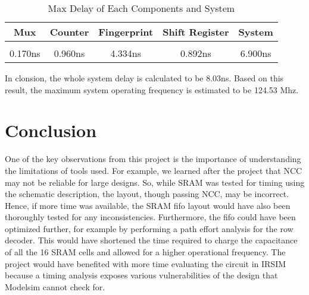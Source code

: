 \documentclass[10pt,journal,compsoc]{IEEEtran}
\begin{document}
    \begin{table}[ht] 
\caption{Max Delay of Each Components and System} %
\centering %
\begin{tabular}{c c c c c} %
\hline\hline %
Mux & Counter & Fingerprint & Shift Register & System\\ [0.5ex] %
\hline %
\\ [0.2 ex]
0.170ns & 0.960ns & 4.334ns & 0.892ns & 6.900ns \\ [1ex] %
\hline %
\end{tabular} 
\label{table:nonlin} %
\end{table} 

    In clonsion, the whole system delay is calculated to be 8.03ns. Based on this result, the maximum system operating frequency is estimated to be 124.53 Mhz. 

\section{Conclusion}
One of the key observations from this project is the importance of understanding the limitations of tools used. For example, we learned after the project that NCC may not be reliable for large designs. So, while SRAM was tested for timing using the schematic description, the layout, though passing NCC, may be incorrect. Hence, if more time was available, the SRAM fifo layout would have also been thoroughly tested for any inconsistencies. Furthermore, the fifo could have been optimized further, for example by performing a path effort analysis for the row decoder. This would have shortened the time required to charge the capacitance of all the 16 SRAM cells and allowed for a higher operational frequency. 
The project would have benefited with more time evaluating the circuit in IRSIM because a timing analysis exposes various vulnerabilities of the design that Modelsim cannot check for. 
\end{document}
